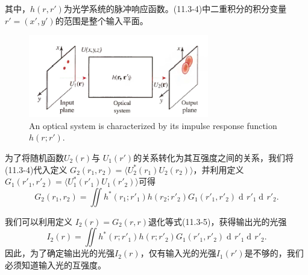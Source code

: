 \documentclass[UTF8]{ctexart}
\numberwithin{figure}{subsection}
\numberwithin{table}{subsection}
\DeclareMathOperator\dif{d\!}
\begin{document}
其中，$h(r, r')$为光学系统的脉冲响应函数。(11.3-4)中二重积分的积分变量 $r' = (x', y')$的范围是整个输入平面。
\begin{figure}[H]
\centering
\includegraphics[width=0.7\textwidth]{11_3_2.PNG}
\caption{An optical system is characterized by its impulse response function $h(r; r')$.}
\label{fig: 11_3_2}
\end{figure}
\par 为了将随机函数$U_2 (r)$与 $U_1 (r')$的关系转化为其互强度之间的关系，我们将(11.3-4)代入定义 $G_2 (r_1, r_2) = \langle U_2^\ast (r_1) U_2(r_2) \rangle$，并利用定义$G_1(r'_1, r'_2) = \langle U_1^\ast (r'_1) U_1(r'_2) \rangle$可得
\begin{equation}
G_2 (r_1, r_2) = \iint h^\ast (r_1; r'_1) h(r_2; r'_2) G_1 (r'_1, r'_2) \dif r'_1 \dif r'_2 .
\end{equation}
\par 我们可以利用定义 $I_2 (r) = G_2 (r, r)$退化等式(11.3-5)，获得输出光的光强
\begin{equation}
I_2 (r) = \iint h^\ast (r; r'_1) h(r; r'_2) G_1 (r'_1, r'_2) \dif r'_1 \dif r'_2 .
\end{equation}
因此，为了确定输出光的光强$I_2 (r)$，仅有输入光的光强$I_1 (r')$是不够的，我们必须知道输入光的互强度。
\bigbreak\begingroup
\color{ksc}
\end{document}
